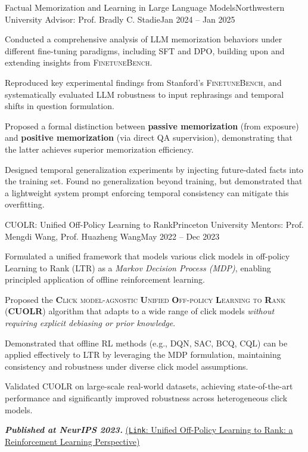         \resumeSubheading
        {Factual Memorization and Learning in Large Language Models}{Northwestern University}
        {Advisor: Prof. Bradly C. Stadie}{Jan 2024 – Jan 2025}
        \resumeItemListStart
        \item\small
        Conducted a comprehensive analysis of LLM memorization behaviors under different fine-tuning paradigms, including \textsc{SFT} and \textsc{DPO}, building upon and extending insights from \textsc{FinetuneBench}.
        \item\small
        Reproduced key experimental findings from Stanford's \textsc{FinetuneBench}, and systematically evaluated LLM robustness to input rephrasings and temporal shifts in question formulation.
        \item\small
        Proposed a formal distinction between \textbf{passive memorization} (from exposure) and \textbf{positive memorization} (via direct QA supervision), demonstrating that the latter achieves superior memorization efficiency.
        \item\small
        Designed temporal generalization experiments by injecting future-dated facts into the training set. Found no generalization beyond training, but demonstrated that a lightweight system prompt enforcing temporal consistency can mitigate this overfitting.
        \resumeItemListEnd
        
        \resumeSubheading
        {CUOLR: Unified Off-Policy Learning to Rank}{Princeton University}
        {Mentors: Prof. Mengdi Wang, Prof. Huazheng Wang}{May 2022 – Dec 2023}
        \resumeItemListStart
        \item\small
        Formulated a unified framework that models various click models in off-policy Learning to Rank (LTR) as a \textit{Markov Decision Process (MDP)}, enabling principled application of offline reinforcement learning.
        \item\small
        Proposed the \textsc{\textbf{C}lick model-agnostic \textbf{U}nified \textbf{O}ff-policy \textbf{L}earning to \textbf{R}ank (\textbf{CUOLR})} algorithm that adapts to a wide range of click models \textit{without requiring explicit debiasing or prior knowledge}.
        \item\small
        Demonstrated that offline RL methods (e.g., DQN, SAC, BCQ, CQL) can be applied effectively to LTR by leveraging the MDP formulation, maintaining consistency and robustness under diverse click model assumptions.
        \item\small
        Validated CUOLR on large-scale real-world datasets, achieving state-of-the-art performance and significantly improved robustness across heterogeneous click models.
        \item\small
        \textit{\textbf{Published at NeurIPS 2023.}} \href{https://openreview.net/pdf?id=oDcWnfZyZW}{(\texttt{Link}: Unified Off-Policy Learning to Rank: a Reinforcement Learning Perspective)}
        \resumeItemListEnd
 
\resumeSubHeadingListEnd